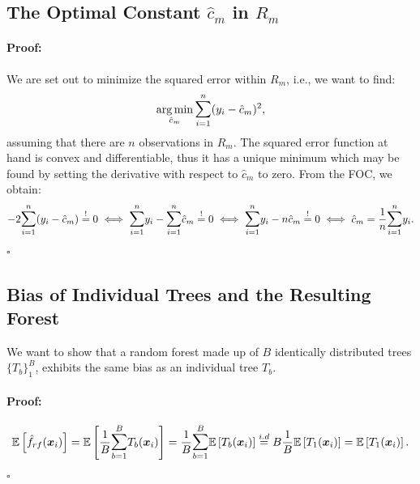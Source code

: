 \documentclass[a4paper,12pt, headsepline]{scrartcl}
\DeclareMathOperator*{\argminA}{arg\,min}
\newenvironment{proof}{\paragraph{Proof:}}{\hfill$\square$}
\numberwithin{equation}{section}
\begin{document}
 \subsection{The Optimal Constant $\hat c_m$ in $R_m$}\label{App:A2}
  \begin{proof}
 We are set out to minimize the squared error within $R_m$, i.e., we want to find:
 \[
 \argminA_{\hat c_m} \mathlarger{\sum}\limits_{i = 1}^{n}(y_i - \hat c_m)^2,
 \]
 assuming that there are $n$ observations in $R_m$. The squared error function at hand is convex and differentiable, thus it has a unique minimum which may be found by setting the derivative with respect to $\hat c_m$ to zero. From the FOC, we obtain:
\begin{gather*}
	  -2\mathlarger{\sum}\limits_{i = 1}^{n}(y_i - \hat c_m) \overset{!}{=} 0 
	 \iff \mathlarger{\sum}\limits_{i = 1}^{n} y_i - \mathlarger{\sum}\limits_{i = 1}^{n} \hat c_m \overset{!}{=} 0
	 \iff \mathlarger{\sum}\limits_{i = 1}^{n} y_i - n \hat c_m \overset{!}{=} 0
	 \iff \hat c_m = \frac{1}{n} \mathlarger{\sum}\limits_{i = 1}^{n} y_i.
\end{gather*}
\end{proof}
\newpage
 \subsection{Bias of Individual Trees and the Resulting Forest}\label{App:A3} 
 We want to show that a random forest made up of $B$ identically distributed trees $\{T_b\}_1^B$, exhibits the same bias as an individual tree $T_b$.
 \begin{proof}
 	\[
 		\mathbb{E}\left[ \hat f_{rf}(\bm x_i)\right] =\mathbb{E}\left[ \frac{1}{B} \mathlarger{\sum}\limits_{b = 1}^B T_b(\bm x_i)\right] = \frac{1}{B}\mathlarger{\sum}\limits_{b = 1}^B \mathbb{E}\left[T_b(\bm x_i)\right]\overset{i.d}{=} B \frac{1}{B}\mathbb{E}\left[T_1(\bm x_i)\right] = \mathbb{E}\left[T_1(\bm x_i)\right].
 	\]
 \end{proof}
\end{document}
